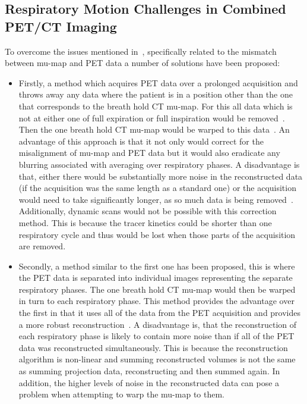         \subsection{Respiratory Motion Challenges in Combined PET/CT Imaging} \label{sec:respiratory_motion_challenges_in_combined_pet_ct_imaging}
            To overcome the issues mentioned in~, specifically related to the mismatch between \gls{mu-map} and \gls{PET} data a number of solutions have been proposed:
            
            \begin{itemize}
                \item Firstly, a method which acquires \gls{PET} data over a prolonged acquisition and throws away any data where the patient is in a position other than the one that corresponds to the breath hold \gls{CT} \gls{mu-map}. For this all data which is not at either one of full expiration or full inspiration would be removed~. %
                Then the one breath hold \gls{CT} \gls{mu-map} would be warped to this data~. An advantage of this approach is that it not only would correct for the misalignment of \gls{mu-map} and \gls{PET} data but it would also eradicate any blurring associated with averaging over respiratory phases. A disadvantage is that,  either there would be substantially more noise in the reconstructed data (if the acquisition was the same length as a standard one) or the acquisition would need to take significantly longer, as so much data is being removed~. Additionally, dynamic scans would not be possible with this correction method. This is because the tracer kinetics could be shorter than one respiratory cycle and thus would be lost when those parts of the acquisition are removed.
                
                \item Secondly, a method similar to the first one has been proposed, this is where the \gls{PET} data is separated into individual images representing the separate respiratory phases. The one breath hold \gls{CT} \gls{mu-map} would then be warped in turn to each respiratory phase. This method provides the advantage over the first in that it uses all of the data from the \gls{PET} acquisition and provides a more robust reconstruction~. A disadvantage is, that the reconstruction of each respiratory phase is likely to contain more noise than if all of the \gls{PET} data was reconstructed simultaneously. This is because the reconstruction algorithm is non-linear and summing reconstructed volumes is not the same as summing projection data, reconstructing and then summed again. %
                In addition, the higher levels of noise in the reconstructed data can pose a problem when attempting to warp the \gls{mu-map} to them.
                

\end{itemize}
